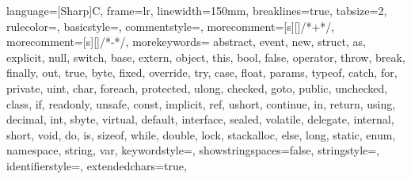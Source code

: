 \usepackage{listings}
\usepackage{listing}
\usepackage{xcolor}





\newcommand\digitstyle{\color{smagenta}}
\newcommand\symbolstyle{\color{base01}}
 {
  language=[Sharp]C,
  frame=lr,
  linewidth=150mm,
  breaklines=true,
  tabsize=2,
  rulecolor=\color{base2},
  basicstyle=\footnotesize\ttfamily,
  commentstyle=\color{base01},
  morecomment=[s][\color{base01}]{/*+}{*/},
  morecomment=[s][\color{base01}]{/*-}{*/},
  morekeywords={  abstract, event, new, struct,
                as, explicit, null, switch,
                base, extern, object, this,
                bool, false, operator, throw,
                break, finally, out, true,
                byte, fixed, override, try,
                case, float, params, typeof,
                catch, for, private, uint,
                char, foreach, protected, ulong,
                checked, goto, public, unchecked,
                class, if, readonly, unsafe,
                const, implicit, ref, ushort,
                continue, in, return, using,
                decimal, int, sbyte, virtual,
                default, interface, sealed, volatile,
                delegate, internal, short, void,
                do, is, sizeof, while,
                double, lock, stackalloc,
                else, long, static,
                enum, namespace, string, var},
  keywordstyle=\color{sgreen},
  showstringspaces=false,
  stringstyle=\color{scyan},
  identifierstyle=\color{sblue},
  extendedchars=true,
}

